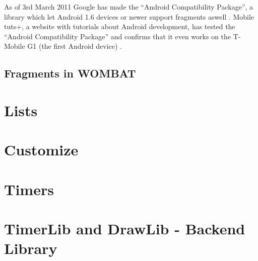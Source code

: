As of 3rd March 2011 Google has made the "`Android Compatibility Package"', a library which let Android 1.6 devices or newer support fragments aswell \cite{web:android:fragments:support}.
Mobile tuts+, a website with tutorials about Android development, has tested the "`Android Compatibility Package"' and confirms that it even works on the T-Mobile G1 (the first Android device) \cite{web:android:fragments:compatibility}.
 
\subsection{Fragments in WOMBAT}

\section{Lists}

\section{Customize}

\section{Timers}

\section{TimerLib and DrawLib - Backend Library}
